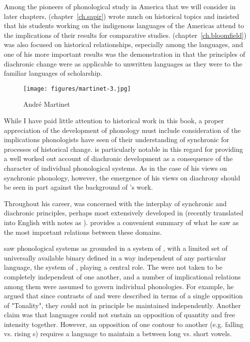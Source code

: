 Among the pioneers of phonological study in America that we will
consider in later chapters, {\Sapir} (chapter~\ref{ch.sapir}) wrote much
on historical topics and insisted that his students working on the
indigenous languages of the Americas attend to the implications of
their results for comparative studies.  {\Bloomfield}
(chapter~\ref{ch.bloomfield}) was also focused on historical
relationships, especially among the  languages, and one of
his more important results was the demonstration in
\citealt{bloomfield25:algonquian} that the principles of diachronic
change were as applicable to unwritten languages as they were to the
familiar languages of  scholarship.

\begin{wrapfigure}[13]{l}{.3\textwidth}
  \texttt{[image: figures/martinet-3.jpg]}
  \caption{André Martinet}
  \label{fig:ch.martinet.martinet3}
\end{wrapfigure}
While I have paid little attention to historical work
in this book, a proper appreciation of the development of phonology
must include consideration of the implications phonologists have
seen of their understanding of synchronic  for processes
of historical
change. \citet{martinet52:function.structure,martinet55:economie} is
particularly notable in this regard for providing a well worked out account of
diachronic development as a consequence of the character of individual
phonological systems. As in the case of his views on synchronic
phonology, however, the emergence of his views on diachrony should be
seen in part against the background of {\Jakobson}'s work.

Throughout his career, {\Jakobson} was concerned with the interplay of
synchronic and diachronic principles, perhaps most extensively
developed in \citealt{jakobson29:remarks} (recently translated into
{English} with notes as \citealt{jakobson18:remarks}).
\citet{jakobson49:historical} provides a convenient summary of what he
saw as the most important relations between these domains.

{\Jakobson} saw phonological systems as grounded in a system of
, with a limited set of universally available binary
 defined in a way independent of any particular language,
the system of , playing a central role. The
 were not taken to be completely independent of
one another, and a number of implicational relations among them were
assumed to govern individual phonologies. For example, he argued that
since contrasts of  and  were described in terms of 
a single opposition of "Tonality", they could not in principle be maintained independently.
Another claim was that languages could not sustain an opposition of  quantity and
free intensity  together. However, an opposition of one
 contour to another (e.g. falling vs. rising s) requires a
language to maintain a  between long vs. short vowels.

